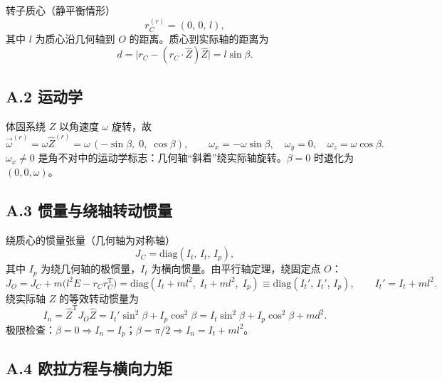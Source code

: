 \documentclass[11pt,a4paper]{article}
\theoremstyle{remark}\newtheorem{remark}{注}
\begin{document}
转子质心（静平衡情形）
\begin{equation}
r_C^{(r)}=(0,\,0,\,l),
\end{equation}
其中 $l$ 为质心沿几何轴到 $O$ 的距离。质心到实际轴的距离为
\begin{equation}
d=\bigl|r_C-(r_C\cdot\hat Z)\hat Z\bigr|=l\sin\beta .
\label{eq:app-d}
\end{equation}

\subsection*{A.2 运动学}

体固系绕 $Z$ 以角速度 $\omega$ 旋转，故
\begin{equation}
\vec\omega^{(r)}=\omega\hat Z^{(r)}
=\omega\,(-\sin\beta,\;0,\;\cos\beta),
\qquad
\omega_x=-\omega\sin\beta,\quad \omega_y=0,\quad \omega_z=\omega\cos\beta .
\label{eq:app-omega}
\end{equation}
$\omega_x\neq0$ 是角不对中的运动学标志：几何轴“斜着”绕实际轴旋转。$\beta=0$ 时退化为 $(0,0,\omega)$。

\subsection*{A.3 惯量与绕轴转动惯量}

绕质心的惯量张量（几何轴为对称轴）
\begin{equation}
J_C=\mathrm{diag}(I_t,\,I_t,\,I_p),
\end{equation}
其中 $I_p$ 为绕几何轴的极惯量，$I_t$ 为横向惯量。由平行轴定理，绕固定点 $O$：
\begin{equation}
J_O=J_C+m\bigl(l^2E-r_Cr_C^{\mathrm T}\bigr)
=\mathrm{diag}(I_t+ml^2,\;I_t+ml^2,\;I_p)
\equiv\mathrm{diag}(I_t',\,I_t',\,I_p),
\qquad I_t'=I_t+ml^2 .
\end{equation}
绕实际轴 $Z$ 的等效转动惯量为
\begin{equation}
I_n=\hat Z^{\mathrm T}J_O\hat Z
=I_t'\sin^2\beta+I_p\cos^2\beta
=I_t\sin^2\beta+I_p\cos^2\beta+m d^2 .
\label{eq:app-In}
\end{equation}
极限检查：$\beta=0\Rightarrow I_n=I_p$；$\beta=\pi/2\Rightarrow I_n=I_t+ml^2$。

\subsection*{A.4 欧拉方程与横向力矩}
\end{document}
